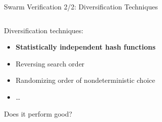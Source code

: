 \documentclass[aspectratio=169]{beamer}
\begin{document}
\begin{frame}{Swarm Verification 2/2: Diversification Techniques}
    \begin{columns}
        \begin{column}{.5\textwidth}
            Diversification techniques:

            \begin{itemize}
                \item \textbf{Statistically independent hash functions}
                \item Reversing search order
                \item Randomizing order of nondeterministic choice
                \item \dots
            \end{itemize}

            Does it perform good?

        \end{column}
        \begin{column}{.5\textwidth}
            \begin{figure}
                \begin{subfigure}[b]{.45\textwidth}
\end{subfigure}
\end{figure}
\end{column}
\end{columns}
\end{frame}
\end{document}
